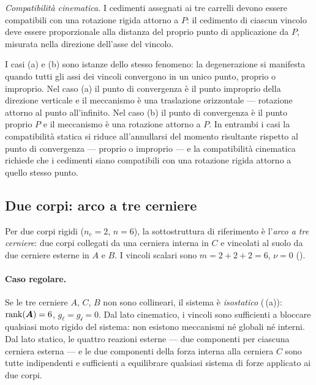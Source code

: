\begin{esempio}
\begin{svolgimento}
		\smallskip
		\noindent\textit{Compatibilità cinematica.}
		I cedimenti assegnati ai tre carrelli devono essere
		compatibili con una rotazione rigida attorno a $P$: il
		cedimento di ciascun vincolo deve essere proporzionale alla
		distanza del proprio punto di applicazione da $P$, misurata
		nella direzione dell'asse del vincolo.
		
		\begin{oss}
			I casi (a) e (b) sono istanze dello stesso fenomeno: la
			degenerazione si manifesta quando tutti gli assi dei vincoli
			convergono in un unico punto, proprio o improprio. Nel
			caso (a) il punto di convergenza è il punto improprio della
			direzione verticale e il meccanismo è una traslazione
			orizzontale --- rotazione attorno al punto all'infinito.
			Nel caso (b) il punto di convergenza è il punto proprio $P$
			e il meccanismo è una rotazione attorno a $P$. In entrambi
			i casi la compatibilità statica si riduce all'annullarsi
			del momento risultante rispetto al punto di convergenza
			--- proprio o improprio --- e la compatibilità cinematica
			richiede che i cedimenti siano compatibili con una rotazione
			rigida attorno a quello stesso punto.
		\end{oss}
	\end{svolgimento}
\end{esempio}

\subsection{Due corpi: arco a tre cerniere}
\label{sec:catalogo_2corpi}

Per due corpi rigidi ($n_c = 2$, $n = 6$), la sottostruttura
di riferimento è l'\emph{arco a tre cerniere}: due corpi
collegati da una cerniera interna in $C$ e vincolati al suolo
da due cerniere esterne in $A$ e $B$.
I vincoli scalari sono $m = 2 + 2 + 2 = 6$, $\nu = 0$
().

\paragraph{Caso regolare.}

Se le tre cerniere $A$, $C$, $B$ non sono collineari, il
sistema è \textit{isostatico} (\,(a)):
$\operatorname{rank}(\bm{A}) = 6$, $g_\ell = g_{\mathscr{i}} = 0$.
Dal lato cinematico,
i vincoli sono sufficienti a bloccare qualsiasi moto
rigido del sistema: non esistono meccanismi né globali
né interni. Dal lato statico, le quattro reazioni esterne
--- due componenti per ciascuna cerniera esterna ---
e le due componenti della forza interna alla cerniera $C$
sono tutte indipendenti e sufficienti a equilibrare
qualsiasi sistema di forze applicato ai due corpi.

